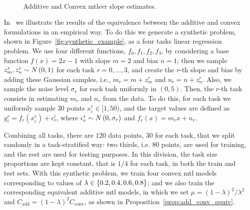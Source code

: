 \begin{figure}[t!]
    \centering
    \quad%
    \\
    \caption{Additive and Convex \acrshort{mtl}\acrshort{svr} slope estimates.}
    \label{fig:synthetic_specWeights}
\end{figure}




In~\citet{RuizAD19} we illustrate the results of the equivalence between the additive and convex formulations in an empirical way. To do this we generate a synthetic problem, shown in Figure~\ref{fig:synthetic_example}, as a four tasks linear regression problem. 
%
We use four different functions, $f_0, f_1, f_2, f_3$, by considering a base function $f(x) = 2x - 1$ with slope $m=2$ and bias $n=1$; then we sample $z_m^r, z_n^r \sim N \left(0, 1\right)$ for each task $r=0, \ldots, 3$, and create the $r$-th slope and bias by adding these Gaussian samples, i.e., $m_r = m + z_m^r$ and $n_r = n + z_n^r$. Also, we sample the noise level $\sigma_r$ for each task uniformly in $(0, 5)$. 
%
Then, the $r$-th task consists in estimating $m_r$ and $n_r$ from the data. To do this, for each task we uniformly sample $30$ points $x_i^r \in [1, 50)$, and the target values are defined as $y_i^r = f_r(x_i^r) + \epsilon^i_r$, where $\epsilon^i_r \sim N \left(0, \sigma_r\right)$ and $f_r(x) = m_r x + n_r$.
%

Combining all tasks, there are $120$ data points, $30$ for each task, that we split randomly in a task-stratified way: two thirds, i.e. $80$ points, are used for training, and the rest are used for testing purposes. In this division, the task size proportions are kept constant, that is $1/4$ for each task, in both the train and test sets. 
%
With this synthetic problem, we train four convex \acrshort{mtl} models corresponding to values of $\lambda \in \left\{0.2, 0.4, 0.6, 0.8\right\}$; and we also train the corresponding equivalent additive \acrshort{mtl} models, in which we set $\mu = (1 - \lambda)^2/\lambda^2$ and $C_\text{add} = (1 - \lambda)^2 C_\text{conv}$, as shown in Proposition~\ref{prop:add_conv_equiv}.
%

